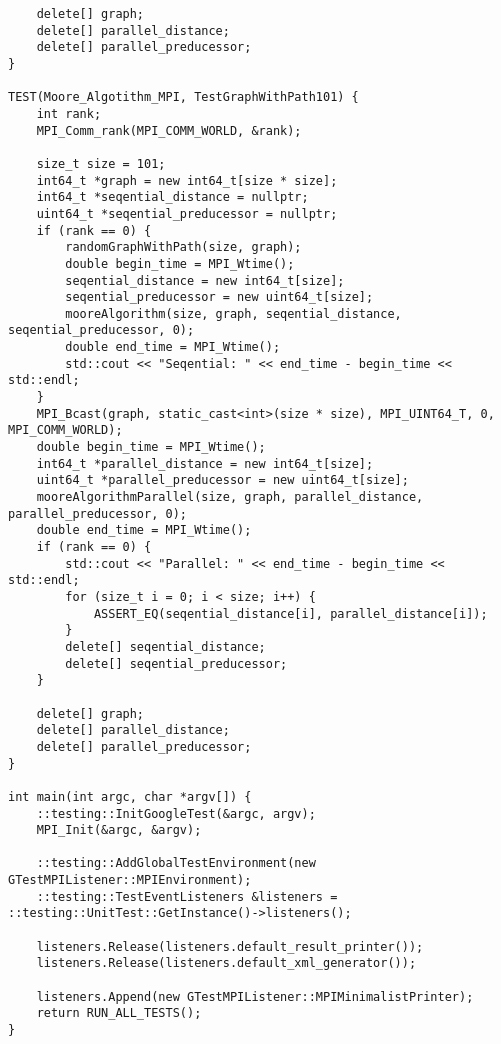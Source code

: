 \documentclass{report}
\begin{document}
\begin{lstlisting}
    delete[] graph;
    delete[] parallel_distance;
    delete[] parallel_preducessor;
}

TEST(Moore_Algotithm_MPI, TestGraphWithPath101) {
    int rank;
    MPI_Comm_rank(MPI_COMM_WORLD, &rank);

    size_t size = 101;
    int64_t *graph = new int64_t[size * size];
    int64_t *seqential_distance = nullptr;
    uint64_t *seqential_preducessor = nullptr;
    if (rank == 0) {
        randomGraphWithPath(size, graph);
        double begin_time = MPI_Wtime();
        seqential_distance = new int64_t[size];
        seqential_preducessor = new uint64_t[size];
        mooreAlgorithm(size, graph, seqential_distance, seqential_preducessor, 0);
        double end_time = MPI_Wtime();
        std::cout << "Seqential: " << end_time - begin_time << std::endl;
    }
    MPI_Bcast(graph, static_cast<int>(size * size), MPI_UINT64_T, 0, MPI_COMM_WORLD);
    double begin_time = MPI_Wtime();
    int64_t *parallel_distance = new int64_t[size];
    uint64_t *parallel_preducessor = new uint64_t[size];
    mooreAlgorithmParallel(size, graph, parallel_distance, parallel_preducessor, 0);
    double end_time = MPI_Wtime();
    if (rank == 0) {
        std::cout << "Parallel: " << end_time - begin_time << std::endl;
        for (size_t i = 0; i < size; i++) {
            ASSERT_EQ(seqential_distance[i], parallel_distance[i]);
        }
        delete[] seqential_distance;
        delete[] seqential_preducessor;
    }

    delete[] graph;
    delete[] parallel_distance;
    delete[] parallel_preducessor;
}

int main(int argc, char *argv[]) {
    ::testing::InitGoogleTest(&argc, argv);
    MPI_Init(&argc, &argv);

    ::testing::AddGlobalTestEnvironment(new GTestMPIListener::MPIEnvironment);
    ::testing::TestEventListeners &listeners = ::testing::UnitTest::GetInstance()->listeners();

    listeners.Release(listeners.default_result_printer());
    listeners.Release(listeners.default_xml_generator());

    listeners.Append(new GTestMPIListener::MPIMinimalistPrinter);
    return RUN_ALL_TESTS();
}
\end{lstlisting}
\end{document}
